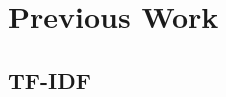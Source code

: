 \documentclass[]{article}
\begin{document}
\section{Previous Work}
\label{sec:PreviousWork}
\subsection{TF-IDF}
\label{sec:TFIDF}
\end{document}
